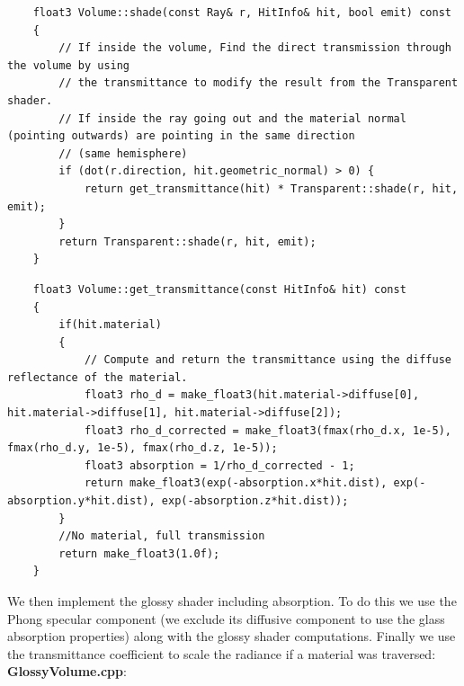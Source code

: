 \documentclass[a4,12pt]{article}
\begin{document}
	\begin{lstlisting}
	float3 Volume::shade(const Ray& r, HitInfo& hit, bool emit) const
	{
		// If inside the volume, Find the direct transmission through the volume by using
		// the transmittance to modify the result from the Transparent shader.
		// If inside the ray going out and the material normal (pointing outwards) are pointing in the same direction
		// (same hemisphere)
		if (dot(r.direction, hit.geometric_normal) > 0) {
			return get_transmittance(hit) * Transparent::shade(r, hit, emit);
		}
		return Transparent::shade(r, hit, emit);
	}
	\end{lstlisting}
	
	\begin{lstlisting}
	float3 Volume::get_transmittance(const HitInfo& hit) const
	{
		if(hit.material)
		{
			// Compute and return the transmittance using the diffuse reflectance of the material.
			float3 rho_d = make_float3(hit.material->diffuse[0], hit.material->diffuse[1], hit.material->diffuse[2]);
			float3 rho_d_corrected = make_float3(fmax(rho_d.x, 1e-5), fmax(rho_d.y, 1e-5), fmax(rho_d.z, 1e-5));
			float3 absorption = 1/rho_d_corrected - 1;
			return make_float3(exp(-absorption.x*hit.dist), exp(-absorption.y*hit.dist), exp(-absorption.z*hit.dist));
		}
		//No material, full transmission
		return make_float3(1.0f);
	}
	\end{lstlisting}
	
	We then implement the glossy shader including absorption. To do this we use the Phong specular component (we exclude its diffusive component to use the glass absorption properties) along with the glossy shader computations. Finally we use the transmittance coefficient to scale the radiance if a material was traversed:
	\textbf{GlossyVolume.cpp}:
	
\end{document}
